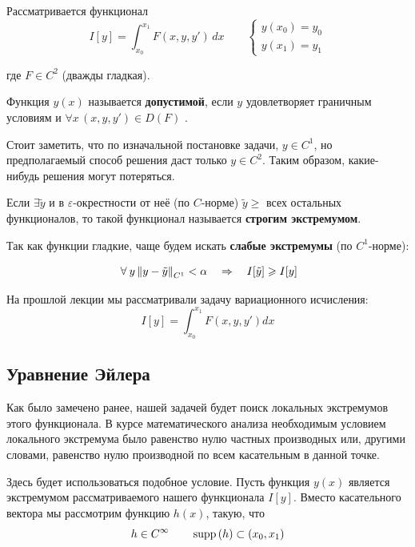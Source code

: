 \documentclass[12pt]{article}
\begin{document}
	Рассматривается функционал 
	$$I[y] = \int_{x_0}^{x_1} F(x,y,y') \,dx \qquad \left\{
	\begin{aligned}
		y(x_0) = y_0 \\
		y(x_1) = y_1
	\end{aligned}
	\right.$$
	
	где $F\in C^2$ (дважды гладкая).
	
	\begin{defi}
		Функция $y(x)$ называется \textbf{допустимой}, если $y$
		удовлетворяет граничным условиям и $\forall x\, (x, y, y')\in D(F)$ .
	\end{defi}
	
	Стоит заметить, что по изначальной постановке задачи, $y \in C^1$, но предполагаемый способ решения
	даст только $y \in C^2$. Таким образом, какие-нибудь решения могут потеряться. 
	
	Если $\exists \tilde{y}$ и в $\varepsilon$-окрестности от неё (по $C$-норме) $\tilde{y} \geq$ всех 
	остальных функционалов, то такой функционал называется \textbf{строгим экстремумом}.
	
	Так как функции гладкие, чаще будем искать \textbf{слабые экстремумы} (по $C^1$-норме):
	
	$$\forall y \norm{y - \tilde{y}}_{C^1} < \alpha \quad\Rightarrow\quad I[\tilde{y}] \geq I[y]$$


	На прошлой лекции мы рассматривали задачу вариационного исчисления:
	$$I[y] = \int_{x_0}^{x_1} F(x, y, y') dx$$
	
	
	\subsection{Уравнение Эйлера}
	
	Как было замечено ранее, нашей задачей будет поиск локальных экстремумов этого функционала. В 
	курсе математического анализа необходимым условием локального экстремума было равенство нулю
	частных производных или, другими словами, равенство нулю производной по всем касательным в данной
	точке.
	
	Здесь будет использоваться подобное условие. Пусть функция $y(x)$ является экстремумом 
	рассматриваемого нашего функционала $I[y]$. Вместо касательного вектора мы рассмотрим
	функцию $h(x)$, такую, что
	$$h \in C^{\infty} \qquad \,\text{supp}\,(h) \subset (x_0, x_1)$$
	
\end{document}
